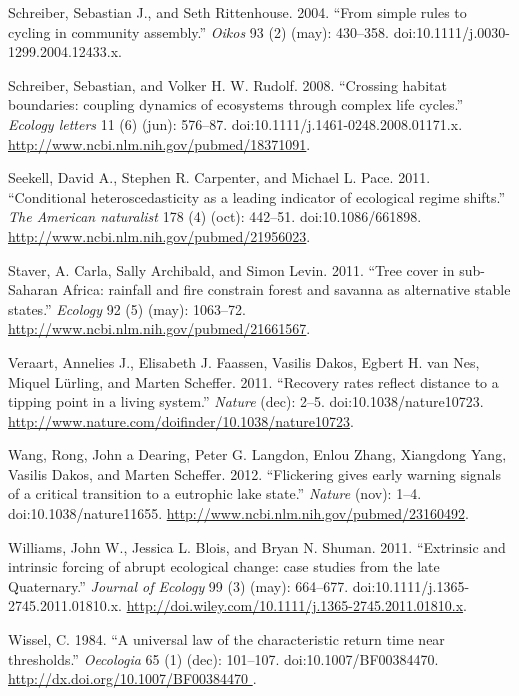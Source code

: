 \documentclass[author-year, review]{elsarticle} %
\begin{document}
Schreiber, Sebastian J., and Seth Rittenhouse. 2004. ``From simple rules
to cycling in community assembly.'' \emph{Oikos} 93 (2) (may): 430--358.
doi:10.1111/j.0030-1299.2004.12433.x.

Schreiber, Sebastian, and Volker H. W. Rudolf. 2008. ``Crossing habitat
boundaries: coupling dynamics of ecosystems through complex life
cycles.'' \emph{Ecology letters} 11 (6) (jun): 576--87.
doi:10.1111/j.1461-0248.2008.01171.x.
\url{http://www.ncbi.nlm.nih.gov/pubmed/18371091}.

Seekell, David A., Stephen R. Carpenter, and Michael L. Pace. 2011.
``Conditional heteroscedasticity as a leading indicator of ecological
regime shifts.'' \emph{The American naturalist} 178 (4) (oct): 442--51.
doi:10.1086/661898. \url{http://www.ncbi.nlm.nih.gov/pubmed/21956023}.

Staver, A. Carla, Sally Archibald, and Simon Levin. 2011. ``Tree cover
in sub-Saharan Africa: rainfall and fire constrain forest and savanna as
alternative stable states.'' \emph{Ecology} 92 (5) (may): 1063--72.
\url{http://www.ncbi.nlm.nih.gov/pubmed/21661567}.

Veraart, Annelies J., Elisabeth J. Faassen, Vasilis Dakos, Egbert H. van
Nes, Miquel Lürling, and Marten Scheffer. 2011. ``Recovery rates reflect
distance to a tipping point in a living system.'' \emph{Nature} (dec):
2--5. doi:10.1038/nature10723.
\url{http://www.nature.com/doifinder/10.1038/nature10723}.

Wang, Rong, John a Dearing, Peter G. Langdon, Enlou Zhang, Xiangdong
Yang, Vasilis Dakos, and Marten Scheffer. 2012. ``Flickering gives early
warning signals of a critical transition to a eutrophic lake state.''
\emph{Nature} (nov): 1--4. doi:10.1038/nature11655.
\url{http://www.ncbi.nlm.nih.gov/pubmed/23160492}.

Williams, John W., Jessica L. Blois, and Bryan N. Shuman. 2011.
``Extrinsic and intrinsic forcing of abrupt ecological change: case
studies from the late Quaternary.'' \emph{Journal of Ecology} 99 (3)
(may): 664--677. doi:10.1111/j.1365-2745.2011.01810.x.
\url{http://doi.wiley.com/10.1111/j.1365-2745.2011.01810.x}.

Wissel, C. 1984. ``A universal law of the characteristic return time
near thresholds.'' \emph{Oecologia} 65 (1) (dec): 101--107.
doi:10.1007/BF00384470.
\href{http://dx.doi.org/10.1007/BF00384470 }{http://dx.doi.org/10.1007/BF00384470
}.
\end{document}
